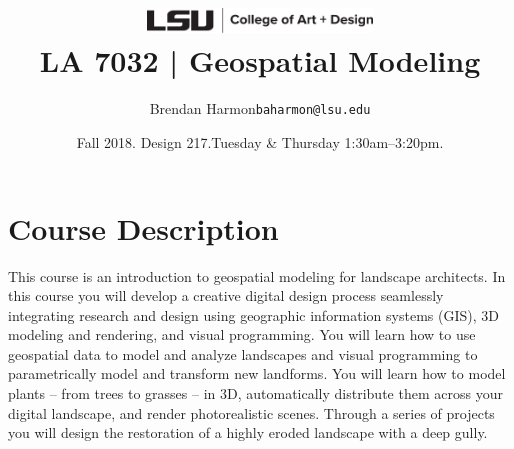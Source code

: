 \documentclass[11pt,article,oneside]{memoir}
\makeatletter
\def\myauthor{Author}
\def\mytitle{Title}
\def\myemail{baharmon@lsu.edu}
\def\myauthor{Brendan Harmon}
\def\mytitle{ \includegraphics[width=6cm]{../images/logos/lsu_art_design_logo.pdf} \\[0.1cm] {\normalfont \normalsize LA 7032 |} \Large Geospatial Modeling} %
\newcommand{\globalcolor}[1]{%
  \color{#1}\global\let\default@color\current@color
}
\makeatother
\begin{document}
\setlength\bibitemsep{0.75em}

\setmainfont[Scale=1, Path = fonts/lato/,BoldItalicFont=Lato-RegIta,BoldFont=Lato-Reg,ItalicFont=Lato-LigIta]{Lato-Lig}
\setsansfont[Scale=1, Path = fonts/lato/,BoldItalicFont=Lato-RegIta,BoldFont=Lato-Reg,ItalicFont=Lato-LigIta]{Lato-Lig}
\setmonofont[Mapping=tex-text,Scale=0.8,Path = fonts/inconsolata/]{i}

\def\ind{\hangindent=1 true cm\hangafter=1 \noindent}
\def\labelitemi{$\cdot$}

\title{\LARGE \mytitle}
\author{\Large\myauthor \newline \footnotesize\texttt{\noindent\myemail}}
\date{Fall 2018. Design 217.\newline Tuesday \& Thursday 1:30am--3:20pm.}
\published{\,}


\globalcolor{black}
\vspace*{-10em}
\maketitle
\clearpage


\globalcolor{black}

\vspace*{-10em}
\maketitle

\section{Course Description}

This course is an introduction to 
geospatial modeling for landscape architects.
In this course you will develop a creative digital design process
seamlessly integrating research and design
using geographic information systems (GIS),
3D modeling and rendering, and
visual programming.
You will learn how to use geospatial data
to model and analyze landscapes
and visual programming to
parametrically model and transform new landforms.
You will learn how to model plants -- from trees to grasses -- in 3D,
automatically distribute them across your digital landscape,
and render photorealistic scenes.
Through a series of projects you will design the restoration 
of a highly eroded landscape with a deep gully.\\
\end{document}
